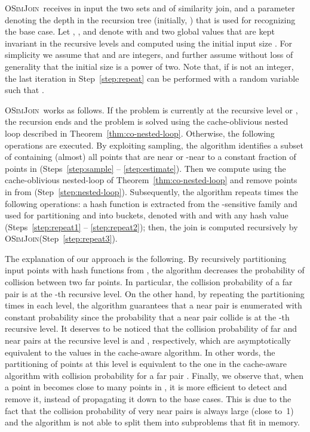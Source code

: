 \documentclass{llncs}
\newcommand{\SimJoin}{\textsc{OSimJoin}}
\begin{document}
\SimJoin\ receives in input the two sets  and  of similarity join, and a parameter  denoting the depth in the recursion tree (initially, ) that is used for recognizing the base case. 
Let  , , and denote with  and  two global values that are kept invariant in the recursive levels and computed using the initial input size . 
For simplicity we assume that  and  are integers, and further assume without loss of generality that the initial size  is a power of two. 
Note that, if  is not an integer, the last iteration in Step~\ref{step:repeat} can be performed with a random variable  such that .

\SimJoin\ works as follows. 
If the problem is currently at the recursive level  or , the recursion ends and  the problem is solved using the cache-oblivious nested loop described in Theorem~\ref{thm:co-nested-loop}. 
Otherwise, the following operations are executed.
By exploiting sampling, the algorithm identifies a subset  of  containing (almost) all points that are near or -near to a constant fraction of points in  (Steps~\ref{step:sample} -- \ref{step:estimate}).
Then we compute  using the cache-oblivious nested-loop of Theorem~\ref{thm:co-nested-loop} and remove points in  from  (Step~\ref{step:nested-loop}).
Subsequently, the algorithm repeats  times the following operations: a hash function is extracted from the -sensitive family and used for partitioning  and  into buckets, denoted with  and  with any hash value  (Steps~\ref{step:repeat1} -- \ref{step:repeat2});
then, the join  is computed recursively by \SimJoin (Step~\ref{step:repeat3}).

The explanation of our approach is the following. 
By recursively partitioning input points with hash functions from , the algorithm decreases the probability of collision between two far points. 
In particular, the collision probability of a far pair is  at the -th recursive level.
On the other hand, by repeating the partitioning  times in each level, the algorithm  guarantees that a near pair is enumerated with constant probability since the probability that a near pair collide is  at the -th recursive level.
It deserves to be noticed that the collision probability of far and near pairs at the recursive level  is  and , respectively, which are asymptotically equivalent to the values in the cache-aware algorithm. 
In other words, the partitioning of points at this level is equivalent to the one in the cache-aware algorithm with collision probability for a far pair .
Finally, we observe that, when a point in  becomes close to many points in , it is more efficient to detect and remove it, instead of propagating it down to the base cases. 
This is due to the fact that the collision probability of very near pairs is always large (close to~1) and the algorithm is not able to split them into subproblems that fit in memory.
\end{document}
